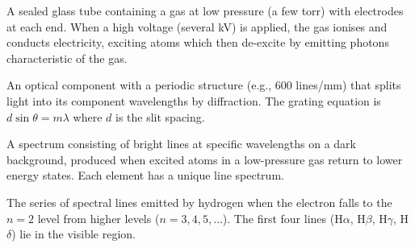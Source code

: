 \documentclass[11pt]{article}
\begin{document}
\begin{definition}
A sealed glass tube containing a gas at low pressure (a few torr) with electrodes at each end. When a high voltage (several kV) is applied, the gas ionises and conducts electricity, exciting atoms which then de-excite by emitting photons characteristic of the gas.
\end{definition}

\begin{definition}
An optical component with a periodic structure (e.g., 600 lines/mm) that splits light into its component wavelengths by diffraction. The grating equation is $d\sin\theta = m\lambda$ where $d$ is the slit spacing.
\end{definition}

\begin{definition}
A spectrum consisting of bright lines at specific wavelengths on a dark background, produced when excited atoms in a low-pressure gas return to lower energy states. Each element has a unique line spectrum.
\end{definition}

\begin{definition}
The series of spectral lines emitted by hydrogen when the electron falls to the $n=2$ level from higher levels ($n=3,4,5,\dots$). The first four lines (H$\alpha$, H$\beta$, H$\gamma$, H$\delta$) lie in the visible region.
\end{definition}
\end{document}
